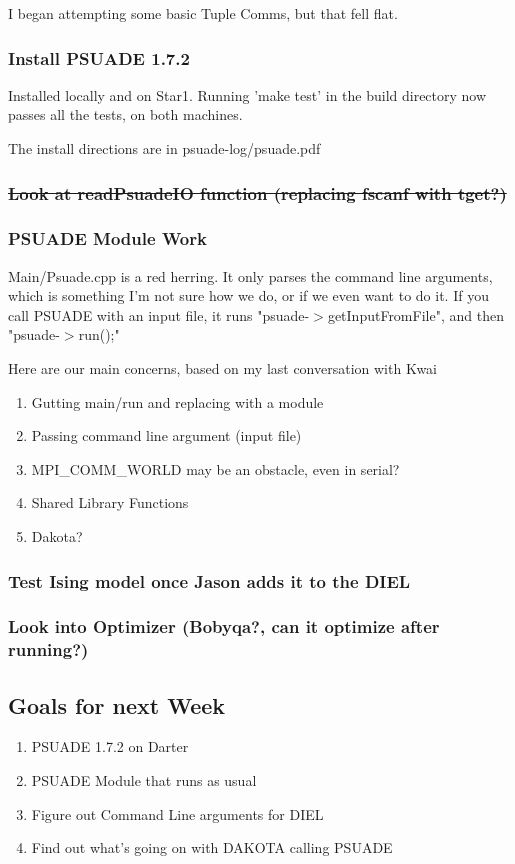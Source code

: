 I began attempting some basic Tuple Comms, but that fell flat.

\subsubsection{Install PSUADE 1.7.2}

Installed locally and on Star1. Running 'make test' in the build directory now passes all the tests, on both machines.

The install directions are in psuade-log/psuade.pdf


\subsubsection{\sout{Look at readPsuadeIO function (replacing fscanf with tget?)}}
\subsubsection{PSUADE Module Work}

Main/Psuade.cpp is a red herring. It only parses the command line arguments, which is something I'm not sure how we do, or if we even want to do it. If you call PSUADE with an input file, it runs "psuade-$>$getInputFromFile", and then "psuade-$>$run();"

Here are our main concerns, based on my last conversation with Kwai

\begin{enumerate}
\item Gutting main/run and replacing with a module
\item Passing command line argument (input file)
\item MPI\_COMM\_WORLD may be an obstacle, even in serial?
\item Shared Library Functions
\item Dakota?
\end{enumerate}




\subsubsection{Test Ising model once Jason adds it to the DIEL}

\subsubsection{Look into Optimizer (Bobyqa?, can it optimize after running?)}



\subsection{Goals for next Week}
\begin{enumerate}
\item PSUADE 1.7.2 on Darter
\item PSUADE Module that runs as usual
\item Figure out Command Line arguments for DIEL
\item Find out what's going on with DAKOTA calling PSUADE
\end{enumerate}



